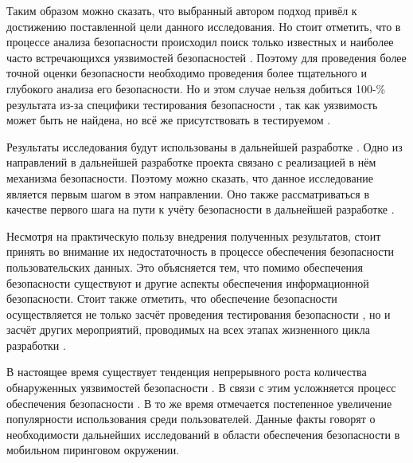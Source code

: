 %
Таким образом можно сказать, что выбранный автором подход привёл к достижению поставленной цели данного исследования. 
%
Но стоит отметить, что в процессе анализа безопасности  происходил поиск только известных и наиболее часто встречающихся уязвимостей безопасностей . 
%
Поэтому для проведения более точной оценки безопасности  необходимо проведения более тщательного и глубокого анализа его безопасности. 
%
Но и этом случае нельзя добиться 100-\% результата из-за специфики тестирования безопасности , так как уязвимость может быть не найдена, но всё же присутствовать в тестируемом . 



%
Результаты исследования будут использованы в дальнейшей разработке . 
%
Одно из направлений в дальнейшей разработке проекта связано с реализацией в нём механизма безопасности.
%
Поэтому можно сказать, что данное исследование является первым шагом в этом направлении. 
%
Оно также рассматриваться в качестве первого шага на пути к учёту безопасности в дальнейшей разработке .

%
Несмотря на практическую пользу внедрения полученных результатов, стоит принять во внимание их недостаточность в процессе обеспечения безопасности пользовательских данных. 
%
Это объясняется тем, что помимо обеспечения безопасности  существуют и другие аспекты обеспечения информационной безопасности. 
%
Стоит также отметить, что обеспечение безопасности  осуществляется не только засчёт проведения тестирования безопасности , но и засчёт других мероприятий, проводимых на всех этапах жизненного цикла разработки . 

%
В настоящее время существует тенденция непрерывного роста количества обнаруженных уязвимостей безопасности . 
%
В связи с этим усложняется процесс обеспечения безопасности . 
%
В то же время отмечается постепенное увеличение популярности использования  среди пользователей. 
%
Данные факты говорят о необходимости дальнейших исследований в области обеспечения безопасности  в мобильном пиринговом окружении. 